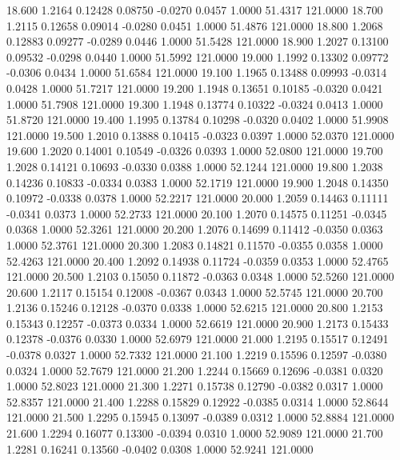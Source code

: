   18.600   1.2164   0.12428   0.08750  -0.0270   0.0457   1.0000  51.4317 121.0000
  18.700   1.2115   0.12658   0.09014  -0.0280   0.0451   1.0000  51.4876 121.0000
  18.800   1.2068   0.12883   0.09277  -0.0289   0.0446   1.0000  51.5428 121.0000
  18.900   1.2027   0.13100   0.09532  -0.0298   0.0440   1.0000  51.5992 121.0000
  19.000   1.1992   0.13302   0.09772  -0.0306   0.0434   1.0000  51.6584 121.0000
  19.100   1.1965   0.13488   0.09993  -0.0314   0.0428   1.0000  51.7217 121.0000
  19.200   1.1948   0.13651   0.10185  -0.0320   0.0421   1.0000  51.7908 121.0000
  19.300   1.1948   0.13774   0.10322  -0.0324   0.0413   1.0000  51.8720 121.0000
  19.400   1.1995   0.13784   0.10298  -0.0320   0.0402   1.0000  51.9908 121.0000
  19.500   1.2010   0.13888   0.10415  -0.0323   0.0397   1.0000  52.0370 121.0000
  19.600   1.2020   0.14001   0.10549  -0.0326   0.0393   1.0000  52.0800 121.0000
  19.700   1.2028   0.14121   0.10693  -0.0330   0.0388   1.0000  52.1244 121.0000
  19.800   1.2038   0.14236   0.10833  -0.0334   0.0383   1.0000  52.1719 121.0000
  19.900   1.2048   0.14350   0.10972  -0.0338   0.0378   1.0000  52.2217 121.0000
  20.000   1.2059   0.14463   0.11111  -0.0341   0.0373   1.0000  52.2733 121.0000
  20.100   1.2070   0.14575   0.11251  -0.0345   0.0368   1.0000  52.3261 121.0000
  20.200   1.2076   0.14699   0.11412  -0.0350   0.0363   1.0000  52.3761 121.0000
  20.300   1.2083   0.14821   0.11570  -0.0355   0.0358   1.0000  52.4263 121.0000
  20.400   1.2092   0.14938   0.11724  -0.0359   0.0353   1.0000  52.4765 121.0000
  20.500   1.2103   0.15050   0.11872  -0.0363   0.0348   1.0000  52.5260 121.0000
  20.600   1.2117   0.15154   0.12008  -0.0367   0.0343   1.0000  52.5745 121.0000
  20.700   1.2136   0.15246   0.12128  -0.0370   0.0338   1.0000  52.6215 121.0000
  20.800   1.2153   0.15343   0.12257  -0.0373   0.0334   1.0000  52.6619 121.0000
  20.900   1.2173   0.15433   0.12378  -0.0376   0.0330   1.0000  52.6979 121.0000
  21.000   1.2195   0.15517   0.12491  -0.0378   0.0327   1.0000  52.7332 121.0000
  21.100   1.2219   0.15596   0.12597  -0.0380   0.0324   1.0000  52.7679 121.0000
  21.200   1.2244   0.15669   0.12696  -0.0381   0.0320   1.0000  52.8023 121.0000
  21.300   1.2271   0.15738   0.12790  -0.0382   0.0317   1.0000  52.8357 121.0000
  21.400   1.2288   0.15829   0.12922  -0.0385   0.0314   1.0000  52.8644 121.0000
  21.500   1.2295   0.15945   0.13097  -0.0389   0.0312   1.0000  52.8884 121.0000
  21.600   1.2294   0.16077   0.13300  -0.0394   0.0310   1.0000  52.9089 121.0000
  21.700   1.2281   0.16241   0.13560  -0.0402   0.0308   1.0000  52.9241 121.0000
